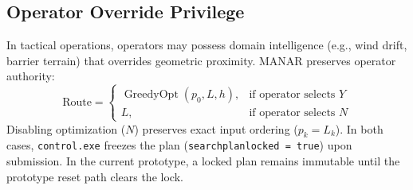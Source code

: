 \subsection{Operator Override Privilege}
In tactical operations, operators may possess domain intelligence (e.g., wind drift, barrier terrain) that overrides geometric proximity. MANAR preserves operator authority:
\begin{equation}
\text{Route} = \begin{cases}
\operatorname{GreedyOpt}(p_0, L, h), & \text{if operator selects } Y \\
L, & \text{if operator selects } N
\end{cases}
\end{equation}
Disabling optimization ($N$) preserves exact input ordering ($p_k = L_k$). In both cases, \texttt{control.exe} freezes the plan (\texttt{searchplanlocked = true}) upon submission. In the current prototype, a locked plan remains immutable until the prototype reset path clears the lock.
